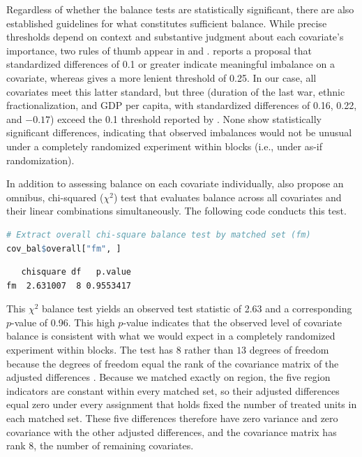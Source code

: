 \documentclass[twoside,11pt]{article}
\begin{document}
Regardless of whether the balance tests are statistically significant,
there are also established guidelines for what constitutes sufficient
balance. While precise thresholds depend on context and substantive
judgment about each covariate's importance, two rules of thumb appear in
\citet{austin2009} and \citet{stuart2010}. \citet{austin2009} reports a
proposal that standardized differences of 0.1 or greater indicate
meaningful imbalance on a covariate, whereas \citet[p.~11]{stuart2010} gives a
more lenient threshold of 0.25. In our
case, all covariates meet this latter standard, but three (duration of
the last war, ethnic fractionalization, and GDP per capita, with
standardized differences of 0.16, 0.22, and $-0.17$) exceed the 0.1
threshold reported by \citet[p.~3090]{austin2009}. None show
statistically significant differences, indicating that observed
imbalances would not be unusual under a completely randomized experiment
within blocks (i.e., under as-if randomization).

In addition to assessing balance on each covariate individually,
\citet{hansenbowers2008} also propose an omnibus, chi-squared
(\(\chi^2\)) test that evaluates balance across all covariates and their
linear combinations simultaneously. The following code conducts this test.

\begin{lstlisting}[language=R]
# Extract overall chi-square balance test by matched set (fm)
cov_bal$overall["fm", ]
\end{lstlisting}

\begin{verbatim}
   chisquare df   p.value
fm  2.631007  8 0.9553417
\end{verbatim}



This \(\chi^2\) balance test yields an observed test statistic of 2.63
and a corresponding \(p\)-value of 0.96. This high \(p\)-value indicates
that the observed level of covariate balance is consistent with what we
would expect in a completely randomized experiment within blocks. The
test has \(8\) rather than \(13\) degrees of freedom because the degrees of
freedom equal the rank of the covariance matrix of the adjusted
differences \citep[p.~229]{hansenbowers2008}. Because we matched exactly
on region, the five region indicators are constant within every matched
set, so their adjusted differences equal zero under every assignment that
holds fixed the number of treated units in each matched set. These five differences therefore have zero variance and zero
covariance with the other adjusted differences, and the covariance matrix
has rank \(8\), the number of remaining covariates.
\end{document}
